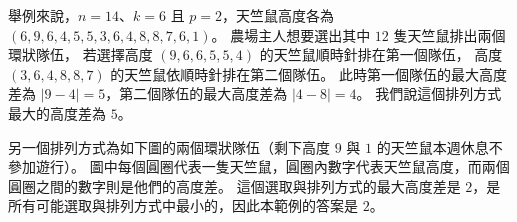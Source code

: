 舉例來說，\begin{math}n = 14\end{math}、\begin{math}k = 6\end{math} 且
\begin{math}p = 2\end{math}，天竺鼠高度各為
\begin{math}(6, 9, 6, 4, 5, 5, 3, 6, 4, 8, 8, 7, 6, 1)\end{math}。
農場主人想要選出其中 \begin{math}12\end{math} 隻天竺鼠排出兩個環狀隊伍，
若選擇高度 \begin{math}(9, 6, 6, 5, 5, 4)\end{math}
的天竺鼠順時針排在第一個隊伍， 高度
\begin{math}(3, 6, 4, 8, 8, 7)\end{math}
的天竺鼠依順時針排在第二個隊伍。 此時第一個隊伍的最大高度差為
\begin{math}|9 - 4|=5\end{math}，第二個隊伍的最大高度差為
\begin{math}|4-8| = 4\end{math}。 我們說這個排列方式最大的高度差為
\begin{math}5\end{math}。

另一個排列方式為如下圖的兩個環狀隊伍（剩下高度 \begin{math}9\end{math}
與 \begin{math}1\end{math} 的天竺鼠本週休息不參加遊行）。
圖中每個圓圈代表一隻天竺鼠，圓圈內數字代表天竺鼠高度，而兩個圓圈之間的數字則是他們的高度差。
這個選取與排列方式的最大高度差是
\begin{math}2\end{math}，是所有可能選取與排列方式中最小的，因此本範例的答案是
\begin{math}2\end{math}。

